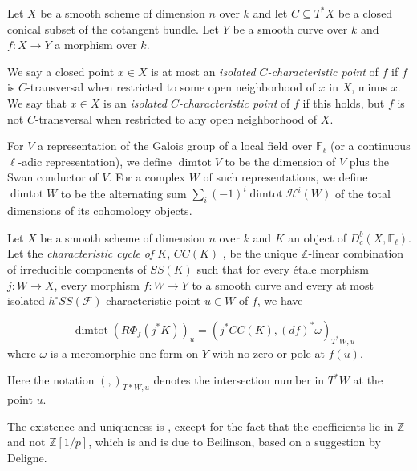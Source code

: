 \begin{definition}
\notready \cite[Definition 5.3(1)]{saito1} Let $X$ be a smooth scheme of dimension $n$ over $k$  and let $C\subseteq T^* X$ be a closed conical subset of the cotangent bundle. Let $Y$ be a smooth curve over $k$ and $f: X\to Y$ a morphism over $k$.

We say a closed point $x \in X$ is at most an \emph{isolated $C$-characteristic point} of $f$ if $f$ is $C$-transversal when restricted to some open neighborhood of $x$ in $X$, minus $x$.  We say that $x\in X$ is an \emph{isolated $C$-characteristic point} of $f$ if this holds, but $f$ is not $C$-transversal when restricted to any open neighborhood of $X$. \end{definition}

\begin{definition}
\notready For $V$ a representation of the Galois group of a local field over $\mathbb F_\ell$ (or a continuous $\ell$-adic representation), we define $\operatorname{dimtot} V$ to be the dimension of $V$ plus the Swan conductor of $V$. For a complex $W$ of such representations, we define $\operatorname{dimtot}W $ to be the alternating sum $\sum_i (-1)^i \operatorname{dimtot} \mathcal H^i(W)$ of the total dimensions of its cohomology objects. \end{definition}

\begin{definition}
\notready\cite[Definition 5.10]{saito1} Let $X$ be a smooth scheme of dimension $n$ over $k$ and $K$ an object of $D^b_c(X, \mathbb F_\ell)$. Let the \emph{characteristic cycle of $K$}, $CC(K)$ , be the unique $\mathbb Z$-linear combination of irreducible components of $SS(K)$ such that for every \'{e}tale morphism $j: W \to X$, every morphism $f: W\to Y$ to a smooth curve and every at most isolated $h^\circ SS(\mathcal F)$-characteristic point $u \in W$ of $f$, we have

\[ - \operatorname{dimtot} \left( R \Phi_f(j^* K) \right)_u =  (j^* CC(K), (df)^*\omega )_{T^*W,u} \] where $\omega$ is a meromorphic one-form on $Y$ with no zero or pole at $f(u)$.

\end{definition}

Here the notation $(,)_{T*W ,u}$ denotes the intersection number in $T^* W$ at the point $u$.

The existence and uniqueness is \cite[Theorem 5.9]{saito1}, except for the fact that the coefficients lie in $\mathbb Z$ and not $\mathbb Z[1/p]$, which is \cite[Theorem 5.18]{saito1} and is due to Beilinson, based on a suggestion by Deligne.
